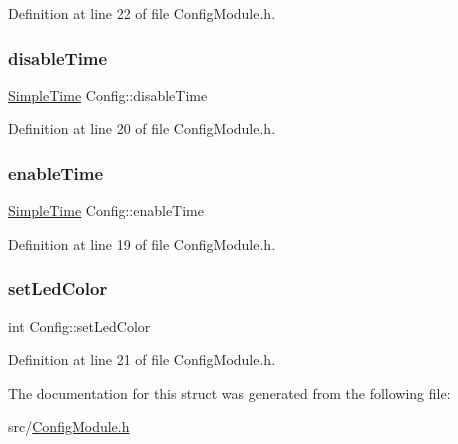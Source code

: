 Definition at line 22 of file Config\+Module.\+h.

\mbox{\label{struct_config_ac16d52dba7a69c2675a7227d5e997f42}} 
\subsubsection{\texorpdfstring{disableTime}{disableTime}}
{\footnotesize\ttfamily \mbox{\hyperlink{class_simple_time}{Simple\+Time}} Config\+::disable\+Time}



Definition at line 20 of file Config\+Module.\+h.

\mbox{\label{struct_config_ab9e6019425ef494d061ef3d82e999b51}} 
\subsubsection{\texorpdfstring{enableTime}{enableTime}}
{\footnotesize\ttfamily \mbox{\hyperlink{class_simple_time}{Simple\+Time}} Config\+::enable\+Time}



Definition at line 19 of file Config\+Module.\+h.

\mbox{\label{struct_config_afa51e4de07b10608a065b4d1966c579c}} 
\subsubsection{\texorpdfstring{setLedColor}{setLedColor}}
{\footnotesize\ttfamily int Config\+::set\+Led\+Color}



Definition at line 21 of file Config\+Module.\+h.



The documentation for this struct was generated from the following file\+:\begin{DoxyCompactItemize}
\item 
src/\mbox{\hyperlink{_config_module_8h}{Config\+Module.\+h}}\end{DoxyCompactItemize}
